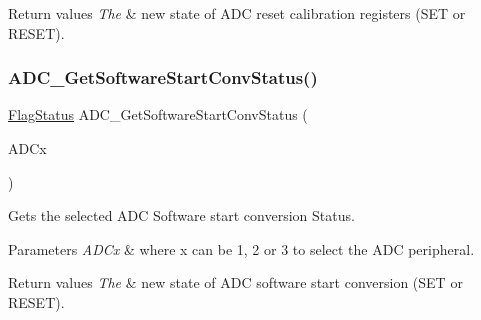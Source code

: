 \begin{DoxyRetVals}{Return values}
{\em The} & new state of A\+DC reset calibration registers (S\+ET or R\+E\+S\+ET). \\
\hline
\end{DoxyRetVals}
\mbox{\label{group___a_d_c___exported___functions_gaf1119583782ecbcec380efcb7eb74883}} 
\subsubsection{\texorpdfstring{ADC\_GetSoftwareStartConvStatus()}{ADC\_GetSoftwareStartConvStatus()}}
{\footnotesize\ttfamily \mbox{\hyperlink{group___exported__types_ga89136caac2e14c55151f527ac02daaff}{Flag\+Status}} A\+D\+C\+\_\+\+Get\+Software\+Start\+Conv\+Status (\begin{DoxyParamCaption}\item[{\mbox{\hyperlink{struct_a_d_c___type_def}{A\+D\+C\+\_\+\+Type\+Def}} $\ast$}]{A\+D\+Cx }\end{DoxyParamCaption})}



Gets the selected A\+DC Software start conversion Status. 


\begin{DoxyParams}{Parameters}
{\em A\+D\+Cx} & where x can be 1, 2 or 3 to select the A\+DC peripheral. \\
\hline
\end{DoxyParams}

\begin{DoxyRetVals}{Return values}
{\em The} & new state of A\+DC software start conversion (S\+ET or R\+E\+S\+ET). \\
\hline
\end{DoxyRetVals}
\mbox{\label{group___a_d_c___exported___functions_ga8765f8835b8cfed13dce3d8d71767dcc}} 
